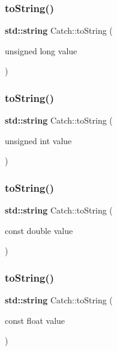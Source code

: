 \subsubsection{\texorpdfstring{to\+String()}{toString()}\hspace{0.1cm}{\footnotesize\ttfamily [9/17]}}
{\footnotesize\ttfamily \textbf{ std\+::string} Catch\+::to\+String (\begin{DoxyParamCaption}\item[{unsigned long}]{value }\end{DoxyParamCaption})}

\mbox{\label{namespace_catch_a6fd78030f740c1c3bdc60efdfd5fc85d}} 
\subsubsection{\texorpdfstring{to\+String()}{toString()}\hspace{0.1cm}{\footnotesize\ttfamily [10/17]}}
{\footnotesize\ttfamily \textbf{ std\+::string} Catch\+::to\+String (\begin{DoxyParamCaption}\item[{unsigned int}]{value }\end{DoxyParamCaption})}

\mbox{\label{namespace_catch_a3eb4356d09b7ef3286f6c1c1efe8cabf}} 
\subsubsection{\texorpdfstring{to\+String()}{toString()}\hspace{0.1cm}{\footnotesize\ttfamily [11/17]}}
{\footnotesize\ttfamily \textbf{ std\+::string} Catch\+::to\+String (\begin{DoxyParamCaption}\item[{const double}]{value }\end{DoxyParamCaption})}

\mbox{\label{namespace_catch_a80b6411e2cba89e58aa8feb960d045d5}} 
\subsubsection{\texorpdfstring{to\+String()}{toString()}\hspace{0.1cm}{\footnotesize\ttfamily [12/17]}}
{\footnotesize\ttfamily \textbf{ std\+::string} Catch\+::to\+String (\begin{DoxyParamCaption}\item[{const float}]{value }\end{DoxyParamCaption})}


